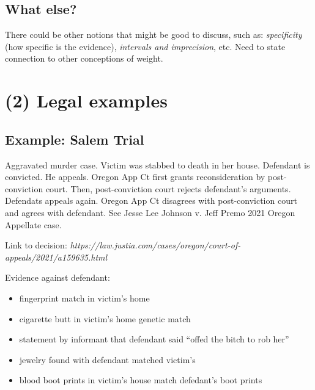 \documentclass[
  10pt,
  dvipsnames,enabledeprecatedfontcommands]{scrartcl}
\begin{document}
\hypertarget{what-else}{%
\subsection{What else?}\label{what-else}}

There could be other notions that might be good to discuss, such as:
\emph{specificity} (how specific is the evidence), \emph{intervals and
imprecision}, etc. Need to state connection to other conceptions of
weight.


\hypertarget{legal-examples}{%
\section{(2) Legal examples}\label{legal-examples}}

\hypertarget{example-salem-trial}{%
\subsection{Example: Salem Trial}\label{example-salem-trial}}


Aggravated murder case. Victim was stabbed to death in her house.
Defendant is convicted. He appeals. Oregon App Ct first grants
reconsideration by post-conviction court. Then, post-conviction court
rejects defendant's arguments. Defendats appeals again. Oregon App Ct
disagrees with post-conviction court and agrees with defendant. See
Jesse Lee Johnson v. Jeff Premo 2021 Oregon Appellate case.

Link to decision:
\textit{https://law.justia.com/cases/oregon/court-of-appeals/2021/a159635.html}

Evidence against defendant:

\begin{itemize}
\item
  fingerprint match in victim's home
\item
  cigarette butt in victim's home genetic match
\item
  statement by informant that defendant said ``offed the bitch to rob
  her''
\item
  jewelry found with defendant matched victim's
\item
  blood boot prints in victim's house match defedant's boot prints
\end{itemize}
\end{document}

